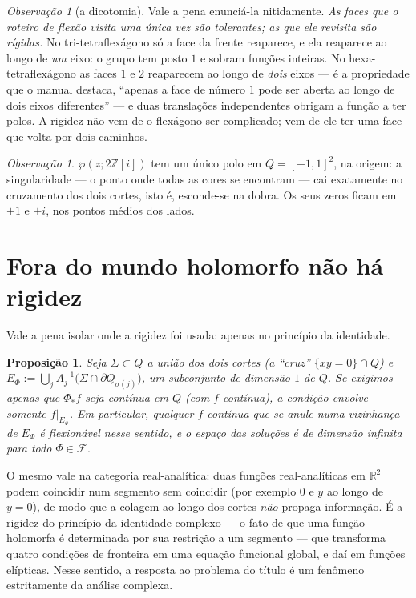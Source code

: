 \documentclass[11pt,a4paper]{article}
\theoremstyle{plain}
\newtheorem{proposicao}[teorema]{Proposição}
\theoremstyle{definition}
\theoremstyle{remark}
\newtheorem{observacao}[teorema]{Observação}
\newcommand{\R}{\mathbb{R}}
\newcommand{\Z}{\mathbb{Z}}
\newcommand{\Zi}{\Z[i]}
\newcommand{\FF}{\mathscr{F}}
\begin{document}
\begin{observacao}[a dicotomia]
Vale a pena enunciá-la nitidamente. \emph{As faces que o roteiro de flexão
visita uma única vez são tolerantes; as que ele revisita são rígidas.} No
tri-tetraflexágono só a face da frente reaparece, e ela reaparece ao longo de
\emph{um} eixo: o grupo tem posto $1$ e sobram funções inteiras. No
hexa-tetraflexágono as faces $1$ e $2$ reaparecem ao longo de \emph{dois} eixos
--- é a propriedade que o manual destaca, ``apenas a face de número $1$ pode
ser aberta ao longo de dois eixos diferentes'' --- e duas translações
independentes obrigam a função a ter polos. A rigidez não vem de o flexágono
ser complicado; vem de ele ter uma face que volta por dois caminhos.
\end{observacao}

\begin{observacao}
$\wp(z;2\Zi)$ tem um único polo em $Q=[-1,1]^2$, na origem: a singularidade ---
o ponto onde todas as cores se encontram --- cai exatamente no cruzamento dos
dois cortes, isto é, esconde-se na dobra. Os seus zeros ficam em $\pm1$ e
$\pm i$, nos pontos médios dos lados.
\end{observacao}

\section{Fora do mundo holomorfo não há rigidez}\label{sec:naoanalitico}
Vale a pena isolar onde a rigidez foi usada: apenas no princípio da identidade.

\begin{proposicao}
Seja $\Sigma\subset Q$ a união dos dois cortes (a ``cruz'' $\{xy=0\}\cap Q$) e
$E_\Phi:=\bigcup_{j}A_j^{-1}\bigl(\Sigma\cap\partial Q_{\sigma(j)}\bigr)$, um
subconjunto de dimensão $1$ de $Q$. Se exigimos apenas que $\Phi_*f$ seja
\emph{contínua} em $Q$ (com $f$ contínua), a condição envolve somente
$f|_{E_\Phi}$. Em particular, qualquer $f$ contínua que se anule numa vizinhança
de $E_\Phi$ é flexionável nesse sentido, e o espaço das soluções é de dimensão
infinita para todo $\Phi\in\FF$.
\end{proposicao}

O mesmo vale na categoria real-analítica: duas funções real-analíticas em
$\R^2$ podem coincidir num segmento sem coincidir (por exemplo $0$ e $y$ ao
longo de $y=0$), de modo que a colagem ao longo dos cortes \emph{não} propaga
informação. É a rigidez do princípio da identidade complexo --- o fato de que
uma função holomorfa é determinada por sua restrição a um segmento --- que
transforma quatro condições de fronteira em uma equação funcional global, e daí
em funções elípticas. Nesse sentido, a resposta ao problema do título é um
fenômeno estritamente da análise complexa.
\end{document}
